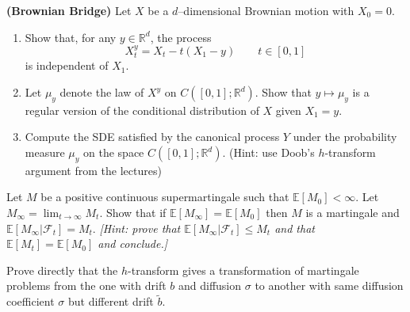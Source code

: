 \documentclass{article}
\newcommand{\tmtextbf}[1]{{\bfseries{#1}}}
\newcommand{\tmtextit}[1]{{\itshape{#1}}}
\newenvironment{enumeratealpha}{\begin{enumerate}[a{\textup{)}}] }{\end{enumerate}}
{\theorembodyfont{\rmfamily\small}\newtheorem{exercise}{Exercise}}
\begin{document}
\hrulefill

\begin{exercise}
  [Pts 2+2+3] \tmtextbf{(Brownian Bridge)} Let $X$ be a $d$--dimensional
  Brownian motion with $X_0 = 0$.
  \begin{enumeratealpha}
    \item Show that, for any $y \in \mathbb{R}^d$, the process
    \[ X^y_t = X_t - t (X_1 - y) \qquad t \in [0, 1] \]
    is independent of $X_1$.
    
    \item Let $\mu_y$ denote the law of $X^y$ on $C ([0, 1] ; \mathbb{R}^d)$.
    Show that $y \mapsto \mu_y$ is a regular version of the conditional
    distribution of $X$ given $X_1 = y$.
    
    \item Compute the SDE satisfied by the canonical process $Y$ under the
    probability measure $\mu_y$ on the space $C ([0, 1] ; \mathbb{R}^d)$.
    (Hint: use Doob's $h$-transform argument from the lectures)
  \end{enumeratealpha}
\end{exercise}

\hrulefill

\begin{exercise}
  [Pts 3] Let $M$ be a positive continuous supermartingale such that
  $\mathbb{E} [M_0] < \infty$. Let $M_{\infty} = \lim_{t \rightarrow \infty}
  M_t$. Show that if $\mathbb{E} [M_{\infty}] =\mathbb{E} [M_0]$ then $M$ is a
  martingale and $\mathbb{E} [M_{\infty} |\mathcal{F}_t] = M_t$.
  \tmtextit{[Hint: prove that $\mathbb{E} [M_{\infty} |\mathcal{F}_t]
  \leqslant M_t$ and that $\mathbb{E} [M_t] =\mathbb{E} [M_0]$ and conclude.]}
\end{exercise}

\hrulefill

\begin{exercise}
  [Pts 4] Prove directly that the $h$-transform gives a transformation of
  martingale problems from the one with drift $b$ and diffusion $\sigma$ to
  another with same diffusion coefficient $\sigma$ but different drift
  $\tilde{b}$.
\end{exercise}

\hrulefill

\
\end{document}
